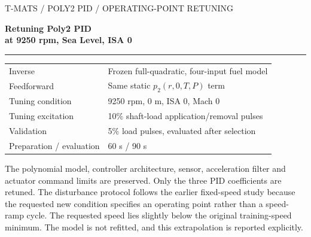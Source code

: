 \documentclass[11pt,a4paper]{article}
\begin{document}
\begin{titlepage}\color{navy}\sffamily
{\small T-MATS / POLY2 PID / OPERATING-POINT RETUNING}\par\vspace{22mm}
{\fontsize{30}{36}\selectfont\bfseries Retuning Poly2 PID\\at 9250 rpm, Sea Level, ISA 0\par}
\vspace{12mm}{\Large Joint tracking and fuel-ringing objective\par}
\vspace{10mm}\color{teal}\rule{\linewidth}{1.2pt}\color{navy}\vspace{8mm}
\begin{tabular}{ll}
Inverse & Frozen full-quadratic, four-input fuel model\\[5pt]
Feedforward & Same static $p_2(r,0,T,P)$ term\\[5pt]
Tuning condition & 9250 rpm, 0 m, ISA 0, Mach 0\\[5pt]
Tuning excitation & 10\% shaft-load application/removal pulses\\[5pt]
Validation & 5\% load pulses, evaluated after selection\\[5pt]
Preparation / evaluation & 60 s / 90 s
\end{tabular}
\par\vspace{12mm}\normalfont\color{ink}
The polynomial model, controller architecture, sensor, acceleration filter and actuator command limits are preserved. Only the three PID coefficients are retuned. The disturbance protocol follows the earlier fixed-speed study because the requested new condition specifies an operating point rather than a speed-ramp cycle.
\vfill The requested speed lies slightly below the original training-speed minimum. The model is not refitted, and this extrapolation is reported explicitly.
\end{titlepage}
\end{document}
